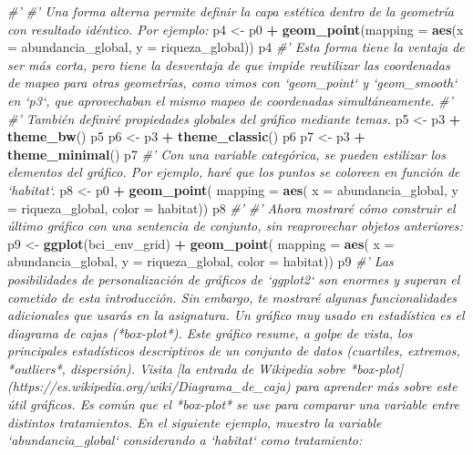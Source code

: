 \documentclass[11pt,]{article}
\newenvironment{Shaded}{\begin{snugshade}}{\end{snugshade}}
\newcommand{\KeywordTok}[1]{\textcolor[rgb]{0.13,0.29,0.53}{\textbf{#1}}}
\newcommand{\DataTypeTok}[1]{\textcolor[rgb]{0.13,0.29,0.53}{#1}}
\newcommand{\StringTok}[1]{\textcolor[rgb]{0.31,0.60,0.02}{#1}}
\newcommand{\CommentTok}[1]{\textcolor[rgb]{0.56,0.35,0.01}{\textit{#1}}}
\newcommand{\OperatorTok}[1]{\textcolor[rgb]{0.81,0.36,0.00}{\textbf{#1}}}
\newcommand{\NormalTok}[1]{#1}
\begin{document}
\begin{Shaded}
\begin{Highlighting}[]
{{{{{{{{{{{{{{{{{{{{{{{{{{{{{{{{{{{{{{{{{{{{{{{{{{{{{{{{{{{{{{{{{{{{{{{{{{{{{{{{{{{{\CommentTok{#' }
\CommentTok{#' Una forma alterna permite definir la capa estética dentro de la geometría con resultado idéntico. Por ejemplo:}
\NormalTok{p4 <-}\StringTok{ }\NormalTok{p0 }\OperatorTok{+}
\StringTok{  }\KeywordTok{geom_point}\NormalTok{(}\DataTypeTok{mapping =} \KeywordTok{aes}\NormalTok{(}\DataTypeTok{x =}\NormalTok{ abundancia_global, }\DataTypeTok{y =}\NormalTok{ riqueza_global))}
\NormalTok{p4}
\CommentTok{#' Esta forma tiene la ventaja de ser más corta, pero tiene la desventaja de que impide reutilizar las coordenadas de mapeo para otras geometrías, como vimos con `geom_point` y `geom_smooth` en `p3`, que aprovechaban el mismo mapeo de coordenadas simultáneamente.}
\CommentTok{#' }
\CommentTok{#' También definiré propiedades globales del gráfico mediante temas.}
\NormalTok{p5 <-}\StringTok{ }\NormalTok{p3 }\OperatorTok{+}\StringTok{ }\KeywordTok{theme_bw}\NormalTok{()}
\NormalTok{p5}
\NormalTok{p6 <-}\StringTok{ }\NormalTok{p3 }\OperatorTok{+}\StringTok{ }\KeywordTok{theme_classic}\NormalTok{()}
\NormalTok{p6}
\NormalTok{p7 <-}\StringTok{ }\NormalTok{p3 }\OperatorTok{+}\StringTok{ }\KeywordTok{theme_minimal}\NormalTok{()}
\NormalTok{p7}
\CommentTok{#' Con una variable categórica, se pueden estilizar los elementos del gráfico. Por ejemplo, haré que los puntos se coloreen en función de `habitat`.}
\NormalTok{p8 <-}\StringTok{ }\NormalTok{p0 }\OperatorTok{+}
\StringTok{  }\KeywordTok{geom_point}\NormalTok{(}
    \DataTypeTok{mapping =} \KeywordTok{aes}\NormalTok{(}
      \DataTypeTok{x =}\NormalTok{ abundancia_global,}
      \DataTypeTok{y =}\NormalTok{ riqueza_global,}
      \DataTypeTok{color =}\NormalTok{ habitat))}
\NormalTok{p8}
\CommentTok{#' }
\CommentTok{#' Ahora mostraré cómo construir el último gráfico con una sentencia de conjunto, sin reaprovechar objetos anteriores:}
\NormalTok{p9 <-}\StringTok{ }\KeywordTok{ggplot}\NormalTok{(bci_env_grid) }\OperatorTok{+}
\StringTok{  }\KeywordTok{geom_point}\NormalTok{(}
    \DataTypeTok{mapping =} \KeywordTok{aes}\NormalTok{(}
      \DataTypeTok{x =}\NormalTok{ abundancia_global,}
      \DataTypeTok{y =}\NormalTok{ riqueza_global,}
      \DataTypeTok{color =}\NormalTok{ habitat))}
\NormalTok{p9}
\CommentTok{#' Las posibilidades de personalización de gráficos de `ggplot2` son enormes y superan el cometido de esta introducción. Sin embargo, te mostraré algunas funcionalidades adicionales que usarás en la asignatura. Un gráfico muy usado en estadística es el diagrama de cajas (*box-plot*). Este gráfico resume, a golpe de vista, los principales estadísticos descriptivos de un conjunto de datos (cuartiles, extremos, *outliers*, dispersión). Visita [la entrada de Wikipedia sobre *box-plot](https://es.wikipedia.org/wiki/Diagrama_de_caja) para aprender más sobre este útil gráficos. Es común que el *box-plot* se use para comparar una variable entre distintos tratamientos. En el siguiente ejemplo, muestro la variable `abundancia_global` considerando a `habitat` como tratamiento:}
}}}}}}}}}}}}}}}}}}}}}}}}}}}}}}}}}}}}}}}}}}}}}}}}}}}}}}}}}}}}}}}}}}}}}}}}}}}}}}}}}}}}
\end{Highlighting}
\end{Shaded}
\end{document}
